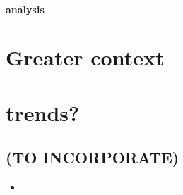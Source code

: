\paragraph{analysis}

\section{Greater context}

\section{trends?}

\begin{unsortedStuff}	
\section*{(TO INCORPORATE)}
	\begin{itemize}
		\item 
	\end{itemize}
\end{unsortedStuff}
		
\begin{optBlankSpace}
	\newpage
	\mbox{}
\end{optBlankSpace}

